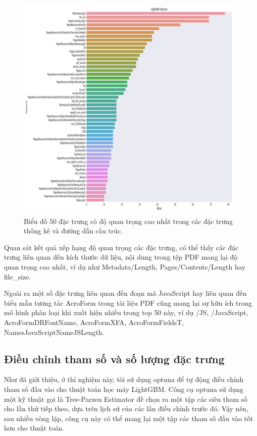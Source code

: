 \documentclass[./../main.tex]{subfiles}
\begin{document}
\begin{figure}[H]
	\centering
	\includegraphics[width=\linewidth]{./images/lgbm_importances-01.png}
	\caption{Biểu đồ 50 đặc trưng có độ quan trọng cao nhất trong các đặc trưng thống kê và đường dẫn cấu trúc.}
	\label{fig:lgbm_importances}
\end{figure}

Quan sát kết quả xếp hạng độ quan trọng các đặc trưng, có thể thấy các đặc trưng liên quan đến kích thước dữ liệu, nội dung trong tệp PDF mang lại độ quan trọng cao nhất, ví dụ như Metadata\slash Length, Pages\slash Contents\slash Length hay file\_size.

Ngoài ra một số đặc trưng liên quan đến đoạn mã JavaScript hay liên quan đến biểu mẫu tương tác AcroForm trong tài liệu PDF cũng mang lại sự hữu ích trong mô hình phân loại khi xuất hiện nhiều trong top 50 này, ví dụ \slash JS, \slash JavaScript, AcroFormDRFontName, AcroFormXFA, AcroFormFieldsT, NamesJavaScriptNameJSLength.

\subsection{Điều chỉnh tham số và số lượng đặc trưng}

Như đã giới thiệu, ở thí nghiệm này, tôi sử dụng optuna để tự động điều chỉnh tham số đầu vào cho thuật toán học máy LightGBM. Công cụ optuna sử dụng một kỹ thuật gọi là Tree-Parzen Estimator \cite{optuna} đề chọn ra một tập các siêu tham số cho lần thử tiếp theo, dựa trên lịch sử của các lần điều chỉnh trước đó. Vậy nên, sau nhiều vòng lặp, công cụ này có thể mang lại một tập các tham số đầu vào tốt hơn cho thuật toán.
\end{document}
